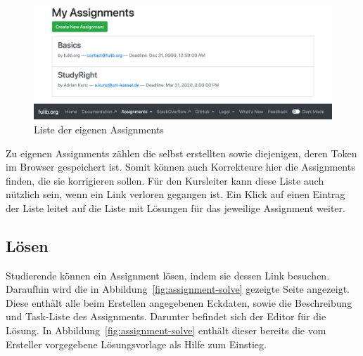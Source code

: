 \begin{figure}
    \centering
    \includegraphics[width=\textwidth]{chapter/fulib.org/img/my-assignments.png}
    \caption{Liste der eigenen Assignments}
    \label{fig:my-assignments}
\end{figure}

Zu eigenen Assignments zählen die selbst erstellten sowie diejenigen, deren Token im Browser gespeichert ist.
Somit können auch Korrekteure hier die Assignments finden, die sie korrigieren sollen.
Für den Kursleiter kann diese Liste auch nützlich sein, wenn ein Link verloren gegangen ist.
Ein Klick auf einen Eintrag der Liste leitet auf die Liste mit Lösungen für das jeweilige Assignment weiter.

\subsection{Lösen}\label{subsec:solution}

Studierende können ein Assignment lösen, indem sie dessen Link besuchen.
Daraufhin wird die in Abbildung~\ref{fig:assignment-solve} gezeigte Seite angezeigt.
Diese enthält alle beim Erstellen angegebenen Eckdaten, sowie die Beschreibung und Task-Liste des Assignments.
Darunter befindet sich der Editor für die Lösung.
In Abbildung~\ref{fig:assignment-solve} enthält dieser bereits die vom Ersteller vorgegebene Lösungsvorlage als Hilfe zum Einstieg.

